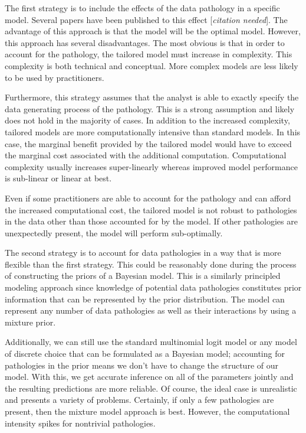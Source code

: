 \documentclass[12pt,titlepage]{mktg-article}
\begin{document}
The first strategy is to include the effects of the data pathology in a specific model. Several papers have been published to this effect {[}\emph{citation needed}{]}. The advantage of this approach is that the model will be the optimal model. However, this approach has several disadvantages. The most obvious is that in order to account for the pathology, the tailored model must increase in complexity. This complexity is both technical and conceptual. More complex models are less likely to be used by practitioners.

Furthermore, this strategy assumes that the analyst is able to exactly specify the data generating process of the pathology. This is a strong assumption and likely does not hold in the majority of cases. In addition to the increased complexity, tailored models are more computationally intensive than standard models. In this case, the marginal benefit provided by the tailored model would have to exceed the marginal cost associated with the additional computation. Computational complexity usually increases super-linearly whereas improved model performance is sub-linear or linear at best.

Even if some practitioners are able to account for the pathology and can afford the increased computational cost, the tailored model is not robust to pathologies in the data other than those accounted for by the model. If other pathologies are unexpectedly present, the model will perform sub-optimally.

The second strategy is to account for data pathologies in a way that is more flexible than the first strategy. This could be reasonably done during the process of constructing the priors of a Bayesian model. This is a similarly principled modeling approach since knowledge of potential data pathologies constitutes prior information that can be represented by the prior distribution. The model can represent any number of data pathologies as well as their interactions by using a mixture prior.

Additionally, we can still use the standard multinomial logit model or any model of discrete choice that can be formulated as a Bayesian model; accounting for pathologies in the prior means we don't have to change the structure of our model. With this, we get accurate inference on all of the parameters jointly and the resulting predictions are more reliable. Of course, the ideal case is unrealistic and presents a variety of problems. Certainly, if only a few pathologies are present, then the mixture model approach is best. However, the computational intensity spikes for nontrivial pathologies.
\end{document}
